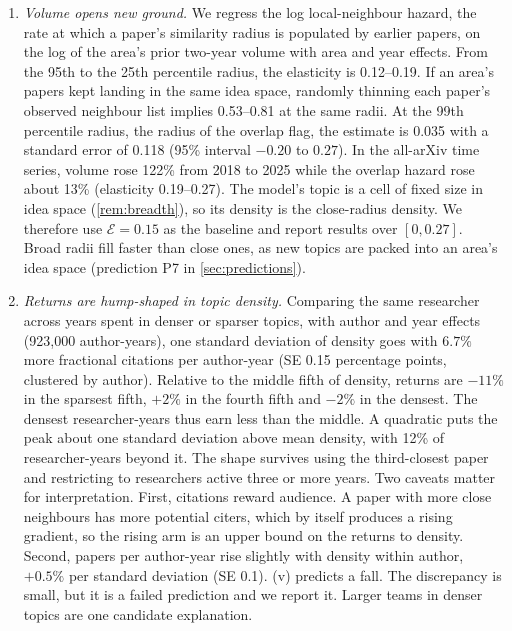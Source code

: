 \begin{enumerate}[label=\textbf{Fact \arabic*.},ref=\arabic*,leftmargin=*]
\item\label{fact:volume} \emph{Volume opens new ground.} We regress the log
local-neighbour hazard, the rate at which a paper's similarity radius is
populated by earlier papers, on the log of the area's prior two-year volume
with area and year effects. From the 95th to the 25th percentile radius, the
elasticity is 0.12--0.19. If an area's papers kept landing in the same idea
space, randomly thinning each paper's observed neighbour list implies
0.53--0.81 at the same radii. At the 99th percentile radius, the radius of the
overlap flag, the estimate is 0.035 with a standard error of 0.118 (95\%
interval $-0.20$ to $0.27$). In the all-arXiv time series, volume rose 122\%
from 2018 to 2025 while the overlap hazard rose about 13\% (elasticity
0.19--0.27). The model's topic is a cell of fixed size in idea space
(\cref{rem:breadth}), so its density is the close-radius density. We therefore
use $\mathcal E=0.15$ as the baseline and report results over $[0,0.27]$. Broad
radii fill faster than close ones, as new topics are packed into an area's idea
space (prediction P7 in \cref{sec:predictions}).

\item\label{fact:hump} \emph{Returns are hump-shaped in topic density.} Comparing
the same researcher across years spent in denser or sparser topics, with author
and year effects (923,000 author-years), one standard deviation of density goes
with $6.7\%$ more fractional citations per author-year (SE 0.15 percentage
points, clustered by author). Relative to the middle fifth of density, returns
are $-11\%$ in the sparsest fifth, $+2\%$ in the fourth fifth and $-2\%$ in the
densest. The densest researcher-years thus earn less than the middle. A
quadratic puts the peak about one standard deviation above mean density, with
12\% of researcher-years beyond it. The shape survives using the third-closest
paper and restricting to researchers active three or more years. Two caveats
matter for interpretation. First, citations reward audience. A paper with more
close neighbours has more potential citers, which by itself produces a rising
gradient, so the rising arm is an upper bound on the returns to density.
Second, papers per author-year rise slightly with density within author,
$+0.5\%$ per standard deviation (SE 0.1). (v) predicts a fall. The
discrepancy is small, but it is a failed prediction and we report it. Larger
teams in denser topics are one candidate explanation.


\end{enumerate}
